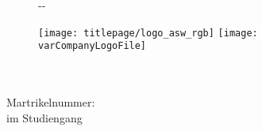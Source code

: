 \makeatletter
\begin{titlepage}
    \begin{figure}[t]
        \begin{adjustwidth}{-\oddsidemargin-1in}{-\rightmargin}
            
            \minipage{0pt}
              \noindent
            \endminipage
            
            \vspace*{10mm}
            \minipage{0.1\paperwidth}
              \hfill
            \endminipage
            \minipage{0.25\paperwidth}
              \texttt{[image: titlepage/logo\_asw\_rgb]}
            \endminipage
            \minipage{0.3\paperwidth}
                \hfill
            \endminipage
            \minipage{0.25\paperwidth}
                \ifdefined\varCompanyLogoFile
                  \texttt{[image: \\varCompanyLogoFile]}
                \else
                  \hfill
                \fi
            \endminipage

        \end{adjustwidth}
    \end{figure}

    \vspace*{2cm}

    \begin{flushleft}
        \Huge
        \textbf{\@title}\\[2cm]

        \LARGE
        {\@author}\\[0.5cm]

        \large
        Martrikelnummer: \varMartrikelnummer \\[0.5cm]

        \Large
        \varArbeit{} im Studiengang\\
        \varStudiengang
    \end{flushleft}

    \vspace{0.5cm}

    \begin{flushright}


\end{flushright}
\end{titlepage}
